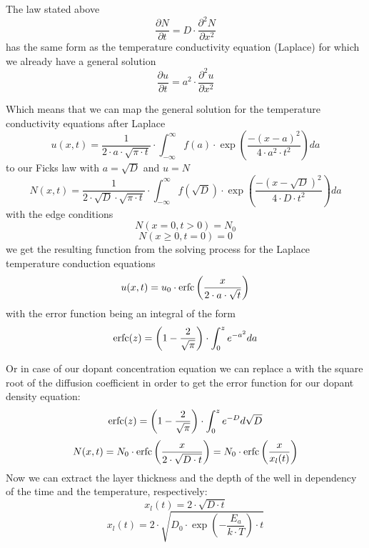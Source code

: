 The law stated above
\begin{equation}
\frac{\partial N}{\partial t} = D \cdot \frac{\partial^2 N}{\partial x^2} 
\end{equation}
has the same form as the temperature conductivity equation (Laplace) for which we already have a general solution
\begin{equation}
\frac{\partial u}{\partial t} = a^2 \cdot \frac{\partial^2 u}{\partial x^2} 
\end{equation}

Which means that we can map the general solution for the temperature conductivity equations after Laplace
\begin{equation}
u(x,t) = \frac{1}{2 \cdot a \cdot \sqrt{\pi \cdot t}} \cdot \int_{-\infty}^{\infty}{f(a)\cdot\exp\left(\frac{-(x-a)^2}{4 \cdot a^2 \cdot t^2}\right)}da
\end{equation}
to our Ficks law with $a=\sqrt{D}$ and $u=N$
\begin{equation}
N(x,t) = \frac{1}{2 \cdot \sqrt{D} \cdot \sqrt{\pi \cdot t}} \cdot \int_{-\infty}^{\infty}{f(\sqrt{D})\cdot\exp\left(\frac{-(x-\sqrt{D})^2}{4 \cdot D \cdot t^2}\right)}da
\label{eq:ficks_law_expanded}
\end{equation}
with the edge conditions
\begin{equation}
N( x=0 , t > 0 ) = N_0
\end{equation}
\begin{equation}
N( x \geq 0 ,  t = 0 ) = 0
\end{equation}
we get the resulting function from the solving process for the Laplace temperature conduction equations
\begin{equation}
u(x,t)=u_0 \cdot\operatorname{erfc}\left(\frac{x}{2 \cdot a \cdot \sqrt{t}}\right)
\end{equation}
with the error function being an integral of the form
\begin{equation}
\operatorname{erfc}(z)
=
\left(1-\frac{2}{\sqrt{\pi}}\right)\cdot\int_0^z{e^{-a^2}}da
\end{equation}

Or in case of our dopant concentration equation we can replace a with the square root of the diffusion coefficient in order to get the error function for our dopant density equation:
\begin{equation}
\operatorname{erfc}(z)
=
\left(1-\frac{2}{\sqrt{\pi}}\right)\cdot\int_0^z{e^{-D}}d\sqrt{D}
\end{equation}
\begin{equation}
N(x,t)
=
N_0 \cdot\operatorname{erfc}\left(\frac{x}{2 \cdot \sqrt{D \cdot t}}\right)
=
N_0 \cdot\operatorname{erfc}\left(\frac{x}{x_l(t)}\right)
\end{equation}
Now we can extract the layer thickness and the depth of the well in dependency of the time and the temperature, respectively:
\begin{equation}
x_l(t) = 2 \cdot \sqrt{D \cdot t}
\end{equation}
\begin{equation}
x_l(t) = 2 \cdot \sqrt{D_0 \cdot \exp\left(-\frac{E_a}{k \cdot T}\right) \cdot t}
\end{equation}

